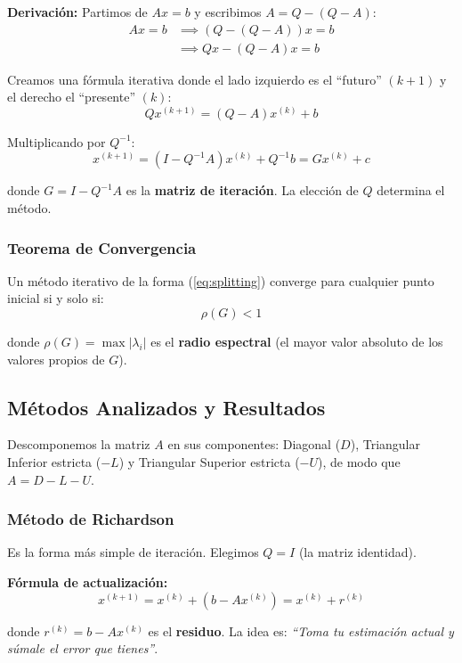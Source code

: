 \documentclass[11pt,letterpaper]{article}
\begin{document}
\textbf{Derivación:} Partimos de $Ax = b$ y escribimos $A = Q - (Q - A)$:
\begin{align*}
Ax = b &\implies (Q - (Q-A))x = b \\
&\implies Qx - (Q-A)x = b
\end{align*}

Creamos una fórmula iterativa donde el lado izquierdo es el ``futuro'' $(k+1)$ y el derecho el ``presente'' $(k)$:
\[
Qx^{(k+1)} = (Q-A)x^{(k)} + b
\]

Multiplicando por $Q^{-1}$:
\begin{equation}
\boxed{x^{(k+1)} = (I - Q^{-1}A)x^{(k)} + Q^{-1}b = Gx^{(k)} + c}
\label{eq:splitting}
\end{equation}

donde $G = I - Q^{-1}A$ es la \textbf{matriz de iteración}. La elección de $Q$ determina el método.

\subsubsection{Teorema de Convergencia}

Un método iterativo de la forma (\ref{eq:splitting}) converge para cualquier punto inicial si y solo si:
\[
\boxed{\rho(G) < 1}
\]

donde $\rho(G) = \max|\lambda_i|$ es el \textbf{radio espectral} (el mayor valor absoluto de los valores propios de $G$).

\subsection{Métodos Analizados y Resultados}

Descomponemos la matriz $A$ en sus componentes: Diagonal ($D$), Triangular Inferior estricta ($-L$) y Triangular Superior estricta ($-U$), de modo que $A = D - L - U$.

\subsubsection{Método de Richardson}

Es la forma más simple de iteración. Elegimos $Q = I$ (la matriz identidad).

\textbf{Fórmula de actualización:}
\[
x^{(k+1)} = x^{(k)} + (b - Ax^{(k)}) = x^{(k)} + r^{(k)}
\]

donde $r^{(k)} = b - Ax^{(k)}$ es el \textbf{residuo}. La idea es: \emph{``Toma tu estimación actual y súmale el error que tienes''}.
\end{document}

